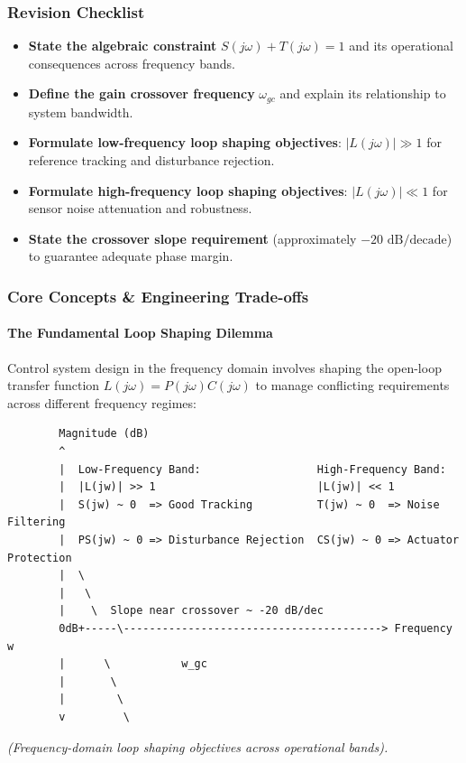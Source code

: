 \documentclass[12pt,onecolumn,twoside ]{article}
\begin{document}
	\subsubsection{Revision Checklist}
	\begin{itemize}
		\item[$\square$]
		\textbf{State the algebraic constraint} $S(j\omega) + T(j\omega) = 1$ and its operational consequences across frequency bands.
		\item[$\square$]
		\textbf{Define the gain crossover frequency} $\omega_{gc}$ and explain its relationship to system bandwidth.
		\item[$\square$]
		\textbf{Formulate low-frequency loop shaping objectives}: $|L(j\omega)| \gg 1$ for reference tracking and disturbance rejection.
		\item[$\square$]
		\textbf{Formulate high-frequency loop shaping objectives}: $|L(j\omega)| \ll 1$ for sensor noise attenuation and robustness.
		\item[$\square$]
		\textbf{State the crossover slope requirement} (approximately $-20\text{ dB/decade}$) to guarantee adequate phase margin.
	\end{itemize}
	
	\subsubsection{Core Concepts \& Engineering Trade-offs}
	\paragraph{The Fundamental Loop Shaping Dilemma}
	Control system design in the frequency domain involves shaping the open-loop transfer function $L(j\omega) = P(j\omega)C(j\omega)$ to manage conflicting requirements across different frequency regimes:
	\begin{lstlisting}
		Magnitude (dB)
		^
		|  Low-Frequency Band:                  High-Frequency Band:
		|  |L(jw)| >> 1                         |L(jw)| << 1
		|  S(jw) ~ 0  => Good Tracking          T(jw) ~ 0  => Noise Filtering
		|  PS(jw) ~ 0 => Disturbance Rejection  CS(jw) ~ 0 => Actuator Protection
		|  \
		|   \
		|    \  Slope near crossover ~ -20 dB/dec
		0dB+-----\----------------------------------------> Frequency w
		|      \           w_gc
		|       \
		|        \
		v         \
	\end{lstlisting}
	\textit{(Frequency-domain loop shaping objectives across operational bands).}
\end{document}
